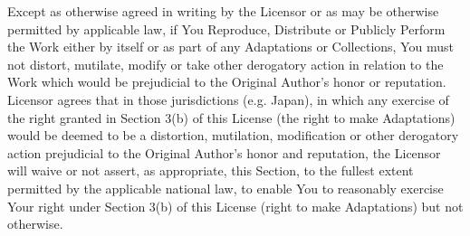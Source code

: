 \documentclass[oneside]{book}
\begin{document}
Except as otherwise agreed in writing by the Licensor or as may be otherwise
permitted by applicable law, if You Reproduce, Distribute or Publicly Perform
the Work either by itself or as part of any Adaptations or Collections, You must
not distort, mutilate, modify or take other derogatory action in relation to the
Work which would be prejudicial to the Original Author's honor or
reputation. Licensor agrees that in those jurisdictions (e.g. Japan), in which
any exercise of the right granted in Section 3(b) of this License (the right to
make Adaptations) would be deemed to be a distortion, mutilation, modification
or other derogatory action prejudicial to the Original Author's honor and
reputation, the Licensor will waive or not assert, as appropriate, this Section,
to the fullest extent permitted by the applicable national law, to enable You to
reasonably exercise Your right under Section 3(b) of this License (right to make
Adaptations) but not otherwise.
\end{document}
